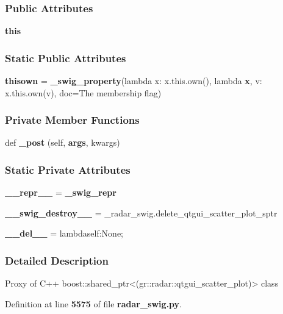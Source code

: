 \subsubsection*{Public Attributes}
\begin{DoxyCompactItemize}
\item 
{\bf this}
\end{DoxyCompactItemize}
\subsubsection*{Static Public Attributes}
\begin{DoxyCompactItemize}
\item 
{\bf thisown} = {\bf \+\_\+swig\+\_\+property}(lambda x\+: x.\+this.\+own(), lambda {\bf x}, v\+: x.\+this.\+own(v), doc=\textquotesingle{}The membership flag\textquotesingle{})
\end{DoxyCompactItemize}
\subsubsection*{Private Member Functions}
\begin{DoxyCompactItemize}
\item 
def {\bf \+\_\+post} (self, {\bf args}, kwargs)
\end{DoxyCompactItemize}
\subsubsection*{Static Private Attributes}
\begin{DoxyCompactItemize}
\item 
{\bf \+\_\+\+\_\+repr\+\_\+\+\_\+} = {\bf \+\_\+swig\+\_\+repr}
\item 
{\bf \+\_\+\+\_\+swig\+\_\+destroy\+\_\+\+\_\+} = \+\_\+radar\+\_\+swig.\+delete\+\_\+qtgui\+\_\+scatter\+\_\+plot\+\_\+sptr
\item 
{\bf \+\_\+\+\_\+del\+\_\+\+\_\+} = lambdaself\+:\+None;
\end{DoxyCompactItemize}


\subsubsection{Detailed Description}
\begin{DoxyVerb}Proxy of C++ boost::shared_ptr<(gr::radar::qtgui_scatter_plot)> class\end{DoxyVerb}
 

Definition at line {\bf 5575} of file {\bf radar\+\_\+swig.\+py}.



